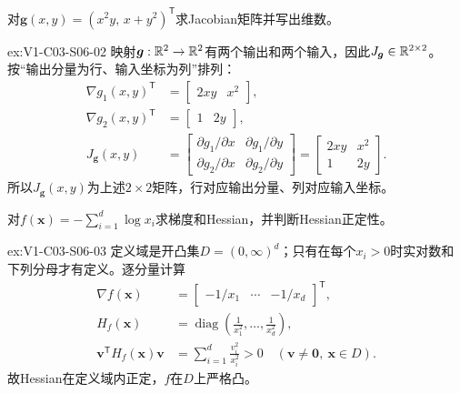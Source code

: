 \begin{SLChapterExercisePairSection}
\begin{exercise}[Jacobian矩阵]\label{ex:V1-C03-S06-02}
对$\boldsymbol g(x,y)=(x^2y,\,x+y^2)^{\mathsf T}$求Jacobian矩阵并写出维数。
\end{exercise}
\label{sol:V1-C03-S06-02}
\begin{chapterexercisesolution}{ex:V1-C03-S06-02}
映射$\boldsymbol g:\mathbb{R}^2\to\mathbb{R}^2$有两个输出和两个输入，因此$J_{\boldsymbol g}\in\mathbb{R}^{2\times2}$。按“输出分量为行、输入坐标为列”排列：
\[
\begin{aligned}
\nabla g_1(x,y)^{\mathsf T}&=\begin{bmatrix}2xy&x^2\end{bmatrix},\\
\nabla g_2(x,y)^{\mathsf T}&=\begin{bmatrix}1&2y\end{bmatrix},\\
J_{\boldsymbol g}(x,y)
&=\begin{bmatrix}
\partial g_1/\partial x&\partial g_1/\partial y\\
\partial g_2/\partial x&\partial g_2/\partial y
\end{bmatrix}
=\begin{bmatrix}2xy&x^2\\1&2y\end{bmatrix}.
\end{aligned}
\]
所以$J_{\boldsymbol g}(x,y)$为上述$2\times2$矩阵，行对应输出分量、列对应输入坐标。
\end{chapterexercisesolution}

\begin{exercise}[对数和梯度]\label{ex:V1-C03-S06-03}
对$f(\boldsymbol{x})=-\sum_{i=1}^{d}\log x_i$求梯度和Hessian，并判断Hessian正定性。
\end{exercise}
\label{sol:V1-C03-S06-03}
\begin{chapterexercisesolution}{ex:V1-C03-S06-03}
定义域是开凸集$D=(0,\infty)^d$；只有在每个$x_i>0$时实对数和下列分母才有定义。逐分量计算
\[
\begin{aligned}
\nabla f(\boldsymbol x)
&=\begin{bmatrix}-1/x_1&\cdots&-1/x_d\end{bmatrix}^{\mathsf T},\\
H_f(\boldsymbol x)
&=\operatorname{diag}\left(\frac1{x_1^2},\ldots,\frac1{x_d^2}\right),\\
\boldsymbol v^{\mathsf T}H_f(\boldsymbol x)\boldsymbol v
&=\sum_{i=1}^d\frac{v_i^2}{x_i^2}>0
\quad(\boldsymbol v\ne\boldsymbol0,\ \boldsymbol x\in D).
\end{aligned}
\]
故Hessian在定义域内正定，$f$在$D$上严格凸。
\end{chapterexercisesolution}


\end{SLChapterExercisePairSection}

